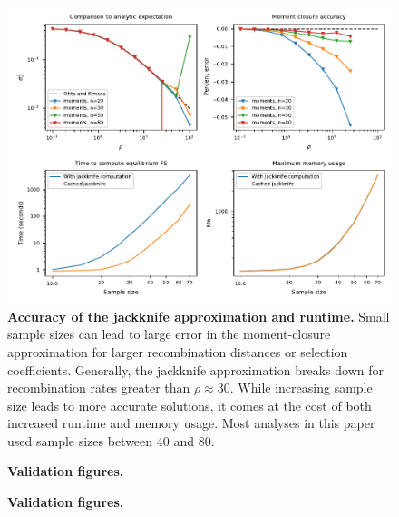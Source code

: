 \documentclass[]{article}
\begin{document}
\begin{figure}[ht!]
    \centering
    \includegraphics{../figures/jackknife}
    \caption{
        \textbf{Accuracy of the jackknife approximation and runtime.}
        Small sample sizes can lead to large error in the moment-closure
        approximation for larger recombination distances or selection
        coefficients. Generally, the jackknife approximation breaks down for
        recombination rates greater than \(\rho\approx30\). While increasing
        sample size leads to more accurate solutions, it comes at the cost of
        both increased runtime and memory usage. Most analyses in this paper
        used sample sizes between 40 and 80.
    }
    \label{fig:jackknife}
\end{figure}

\begin{figure}[ht!]
    \centering
    \caption{\textbf{Validation figures.}}
    \label{fig:validation}
\end{figure}

\begin{figure}[ht!]
    \centering
    \caption{\textbf{Validation figures.}}
    \label{fig:last_validation}
\end{figure}
\end{document}
